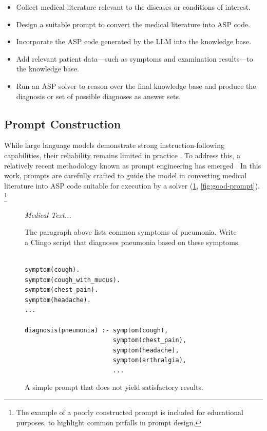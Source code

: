 \documentclass[10pt,leqno]{amsart}
\newenvironment{commandline}{
	\medskip
	\begin{mdframed}[style=commandline]
}{
	\end{mdframed}
	\medskip
}
\newenvironment{prompt}[1][Prompt:]{ %
	\medskip
	\begin{mdframed}[style=warning]
		\noindent{\textbf{#1}}
}{
	\end{mdframed}
}
\begin{document}
\begin{itemize}
    \item Collect medical literature relevant to the diseases or conditions of interest.
    \item Design a suitable prompt to convert the medical literature into ASP code.
    \item Incorporate the ASP code generated by the LLM into the knowledge base.
    \item Add relevant patient data—such as symptoms and examination results—to the knowledge base.
    \item Run an ASP solver to reason over the final knowledge base and produce the diagnosis or set of possible diagnoses as answer sets.
\end{itemize}

\subsection{Prompt Construction}

While large language models demonstrate strong instruction-following capabilities, 
their reliability remains limited in practice \cite{bowman2023things}. 
To address this, a relatively recent methodology known as prompt engineering 
has emerged \cite{liu2021pretrain, promptingguidePromptEngineering}. 
In this work, prompts are carefully crafted to guide the model in 
converting medical literature into ASP code suitable for execution 
by a solver (\cref{fig:bad-prompt}, \cref{fig:good-prompt}).
\footnote{The example of a poorly constructed prompt is included for educational purposes, to highlight common pitfalls in prompt design.}

\begin{figure}[!h]
\centering
\begin{prompt}
\textit{Medical Text...}

The paragraph above lists common symptoms of pneumonia.
Write a Clingo script that diagnoses pneumonia based on these symptoms.
\end{prompt}

\begin{commandline}
\begin{verbatim}

symptom(cough).
symptom(cough_with_mucus).
symptom(chest_pain).
symptom(headache).
...

diagnosis(pneumonia) :- symptom(cough), 
                        symptom(chest_pain), 
                        symptom(headache), 
                        symptom(arthralgia),
                        ...
\end{verbatim}
\end{commandline}

\caption{A simple prompt that does not yield satisfactory results.}
\label{fig:bad-prompt}
\end{figure}
\end{document}
